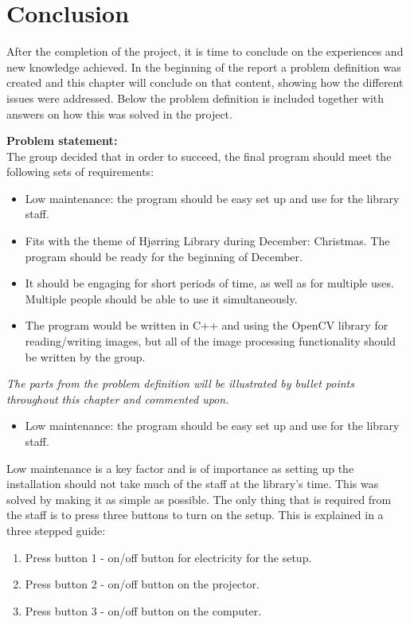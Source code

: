 \chapter{Conclusion}
After the completion of the project, it is time to conclude on the experiences and new knowledge achieved. In the beginning of the report a problem definition was created and this chapter will conclude on that content, showing how the different issues were addressed. Below the problem definition is included together with answers on how this was solved in the project.

\textbf{Problem statement:}\\
The group decided that in order to succeed, the final program should meet the following sets of requirements:

\begin{itemize}
\item Low maintenance: the program should be easy set up and use for the library staff.
\item Fits with the theme of Hj{\o}rring Library during December: Christmas. The program should be ready for the beginning of December.
\item It should be engaging for short periods of time, as well as for multiple uses. Multiple people should be able to use it simultaneously.
\item The program would be written in C++ and using the OpenCV library for reading/writing images, but all of the image processing functionality should be written by the group.
\end{itemize}

\textit{The parts from the problem definition will be illustrated by bullet points throughout this chapter and commented upon.}

\begin{itemize}
\item Low maintenance: the program should be easy set up and use for the library staff.
\end{itemize}
Low maintenance is a key factor and is of importance as setting up the installation should not take much of the staff at the library's time. This was solved by making it as simple as possible. The only thing that is required from the staff is to press three buttons to turn on the setup. This is explained in a three stepped guide:
\begin{enumerate}
\item Press button 1 - on/off button for electricity for the setup.
\item Press button 2 - on/off button on the projector.
\item Press button 3 - on/off button on the computer.
\end{enumerate}

